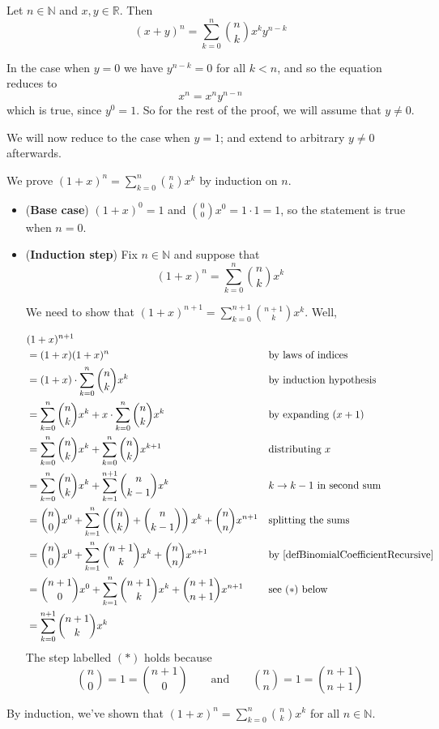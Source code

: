 \begin{theorem}
\label{thmBinomialTheorem}
Let $n \in \mathbb{N}$ and $x,y \in \mathbb{R}$. Then
\[ (x+y)^n = \sum_{k=0}^n \binom{n}{k} x^k y^{n-k} \]
\end{theorem}
\begin{cproof}
In the case when $y=0$ we have $y^{n-k}=0$ for all $k<n$, and so the equation reduces to
\[ x^n = x^ny^{n-n} \]
which is true, since $y^0=1$. So for the rest of the proof, we will assume that $y \ne 0$.

We will now reduce to the case when $y=1$; and extend to arbitrary $y \ne 0$ afterwards.

We prove $(1+x)^n = \sum_{k=0}^n \binom{n}{k} x^k$ by induction on $n$.
\begin{itemize}
\item (\textbf{Base case}) $(1+x)^0=1$ and $\binom{0}{0} x^0 = 1 \cdot 1 = 1$, so the statement is true when $n=0$.
\item (\textbf{Induction step}) Fix $n \in \mathbb{N}$ and suppose that
\[ (1+x)^n = \sum_{k=0}^n \binom{n}{k} x^k \]

We need to show that $(1+x)^{n+1} = \sum_{k=0}^{n+1} \binom{n+1}{k} x^k$. Well,

\begin{align*} \hspace{-30pt}
& (1+x)^{n+1} && \\
&= (1+x)(1+x)^n && \text{by laws of indices} \\
&= (1+x) \cdot \sum_{k=0}^n \binom{n}{k} x^k && \text{by induction hypothesis} \\
&= \sum_{k=0}^n \binom{n}{k} x^k + x \cdot \sum_{k=0}^n \binom{n}{k} x^{k}&& \text{by expanding $(x+1)$} \\
&= \sum_{k=0}^n \binom{n}{k} x^k + \sum_{k=0}^n \binom{n}{k} x^{k+1} && \text{distributing $x$} \\
&= \sum_{k=0}^n \binom{n}{k} x^k + \sum_{k=1}^{n+1} \binom{n}{k-1} x^k && \text{$k \to k-1$ in second sum} \\
&= \binom{n}{0}x^0 + \sum_{k=1}^n \left( \binom{n}{k} + \binom{n}{k-1} \right) x^k + \binom{n}{n}x^{n+1} && \text{splitting the sums} \\
&= \binom{n}{0}x^0 + \sum_{k=1}^n \binom{n+1}{k} x^k + \binom{n}{n}x^{n+1} && \text{by \Cref{defBinomialCoefficientRecursive}} \\
&= \binom{n+1}{0}x^0 + \sum_{k=1}^n \binom{n+1}{k} x^k + \binom{n+1}{n+1}x^{n+1} && \text{see $(*)$ below} \\
&= \sum_{k=0}^{n+1} \binom{n+1}{k} x^k &&
\end{align*}
The step labelled $(*)$ holds because
\[ \binom{n}{0} = 1 = \binom{n+1}{0} \qquad \text{and} \qquad \binom{n}{n} = 1 = \binom{n+1}{n+1} \]
\end{itemize}
By induction, we've shown that $(1+x)^n = \sum_{k=0}^n \binom{n}{k} x^k$ for all $n \in \mathbb{N}$.


\end{cproof}
